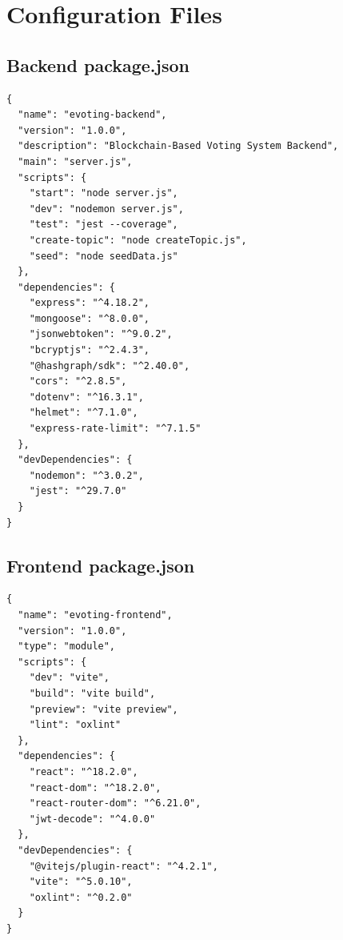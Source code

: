 \chapter{Configuration Files}
\label{app:config}

\section{Backend package.json}
\label{sec:backend-pkg}
\begin{lstlisting}[style=codeStyle, caption=backend/package.json]
{
  "name": "evoting-backend",
  "version": "1.0.0",
  "description": "Blockchain-Based Voting System Backend",
  "main": "server.js",
  "scripts": {
    "start": "node server.js",
    "dev": "nodemon server.js",
    "test": "jest --coverage",
    "create-topic": "node createTopic.js",
    "seed": "node seedData.js"
  },
  "dependencies": {
    "express": "^4.18.2",
    "mongoose": "^8.0.0",
    "jsonwebtoken": "^9.0.2",
    "bcryptjs": "^2.4.3",
    "@hashgraph/sdk": "^2.40.0",
    "cors": "^2.8.5",
    "dotenv": "^16.3.1",
    "helmet": "^7.1.0",
    "express-rate-limit": "^7.1.5"
  },
  "devDependencies": {
    "nodemon": "^3.0.2",
    "jest": "^29.7.0"
  }
}
\end{lstlisting}

\section{Frontend package.json}
\label{sec:frontend-pkg}
\begin{lstlisting}[style=codeStyle, caption=frontend/package.json]
{
  "name": "evoting-frontend",
  "version": "1.0.0",
  "type": "module",
  "scripts": {
    "dev": "vite",
    "build": "vite build",
    "preview": "vite preview",
    "lint": "oxlint"
  },
  "dependencies": {
    "react": "^18.2.0",
    "react-dom": "^18.2.0",
    "react-router-dom": "^6.21.0",
    "jwt-decode": "^4.0.0"
  },
  "devDependencies": {
    "@vitejs/plugin-react": "^4.2.1",
    "vite": "^5.0.10",
    "oxlint": "^0.2.0"
  }
}
\end{lstlisting}

